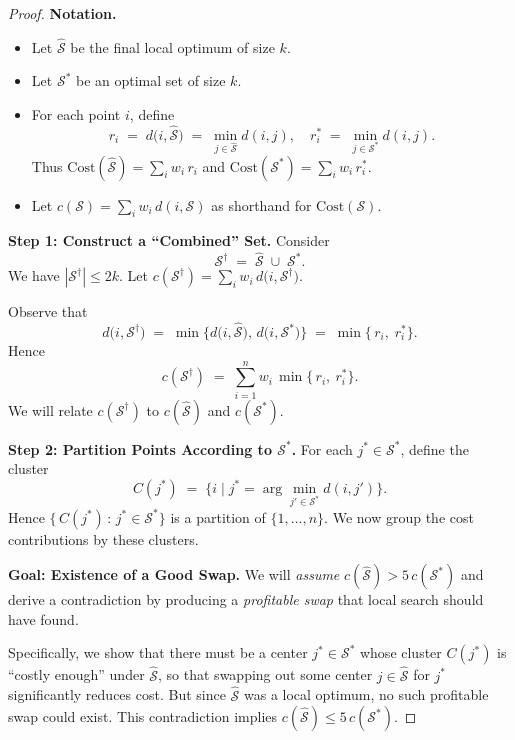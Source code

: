 \begin{proof}
\textbf{Notation.}
\begin{itemize}
\item Let $\widehat{\mathcal{S}}$ be the final local optimum of size $k$. 
\item Let $\mathcal{S}^*$ be an optimal set of size $k$. 
\item For each point $i$, define
\[
  r_i 
  \;=\; 
  d\!\bigl(i,\widehat{\mathcal{S}}\bigr)
  \;=\;
  \min_{j \in \widehat{\mathcal{S}}} d(i,j),
  \quad
  r_i^*
  \;=\;
  \min_{j\in \mathcal{S}^*} d(i,j).
\]
Thus $\mathrm{Cost}(\widehat{\mathcal{S}}) = \sum_i w_i\,r_i$ and $\mathrm{Cost}(\mathcal{S}^*) = \sum_i w_i\,r_i^*$.

\item Let $c(\mathcal{S}) = \sum_i w_i\,d(i,\mathcal{S})$ as shorthand for $\mathrm{Cost}(\mathcal{S})$. 
\end{itemize}

\noindent
\textbf{Step 1: Construct a ``Combined'' Set.}  
Consider 
\[
  \mathcal{S}^\dagger 
  \;=\;
  \widehat{\mathcal{S}}
  \;\cup\;
  \mathcal{S}^*.
\]
We have $|\mathcal{S}^\dagger|\le 2k$.  Let $c(\mathcal{S}^\dagger) = \sum_i w_i\,d\bigl(i,\mathcal{S}^\dagger\bigr)$.  

Observe that
\[
  d\!\bigl(i,\mathcal{S}^\dagger\bigr)
  \;=\;
  \min\!\bigl\{
    d\!\bigl(i,\widehat{\mathcal{S}}\bigr),\,
    d\!\bigl(i,\mathcal{S}^*\bigr)
  \bigr\}
  \;=\;
  \min\{\,r_i,\;r_i^*\}.
\]
Hence
\[
  c(\mathcal{S}^\dagger)
  \;=\;
  \sum_{i=1}^n 
    w_i\,
    \min\{\,r_i,\ r_i^*\}.
\]
We will relate $c(\mathcal{S}^\dagger)$ to $c(\widehat{\mathcal{S}})$ and $c(\mathcal{S}^*)$.

\medskip
\noindent
\textbf{Step 2: Partition Points According to $\mathcal{S}^*$.}  
For each $j^*\in \mathcal{S}^*$, define the cluster 
\[
  C(j^*)
  \;=\;
  \bigl\{
    i \mid j^* 
    = 
    \arg\min_{j'\in \mathcal{S}^*} d(i,j')
  \bigr\}.
\]
Hence $\{\,C(j^*)\,:\,j^*\in \mathcal{S}^*\}$ is a partition of $\{1,\dots,n\}$.  We now group the cost contributions by these clusters.

\medskip
\noindent
\textbf{Goal: Existence of a Good Swap.}
We will \emph{assume} $c(\widehat{\mathcal{S}})>5\,c(\mathcal{S}^*)$ and derive a contradiction by producing a \emph{profitable swap} that local search should have found.  

Specifically, we show that there must be a center $j^*\in \mathcal{S}^*$ whose cluster $C(j^*)$ is “costly enough” under $\widehat{\mathcal{S}}$, so that swapping out some center $j\in\widehat{\mathcal{S}}$ for $j^*$ significantly reduces cost.  But since $\widehat{\mathcal{S}}$ was a local optimum, no such profitable swap could exist.  This contradiction implies $c(\widehat{\mathcal{S}})\le 5\,c(\mathcal{S}^*)$.


\end{proof}
